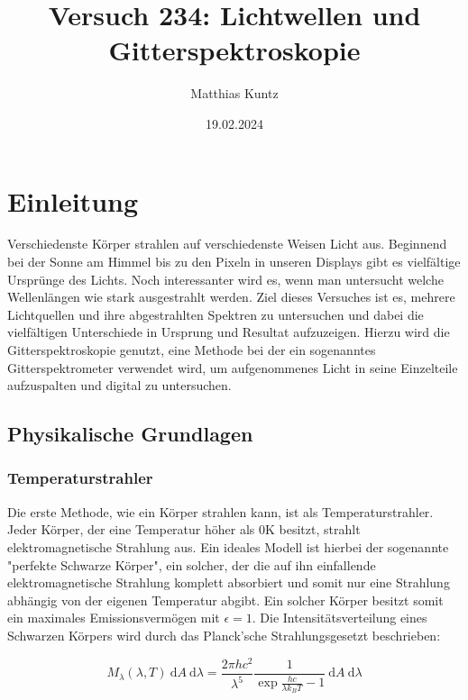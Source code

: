 \documentclass{article}
\title{Versuch 234: Lichtwellen und Gitterspektroskopie}
\author{Matthias Kuntz}
\date{19.02.2024}
\begin{document}
\maketitle

\tableofcontents

\newpage

\section{Einleitung}

Verschiedenste Körper strahlen auf verschiedenste Weisen Licht aus. Beginnend bei der Sonne am Himmel bis zu den Pixeln in unseren Displays gibt es vielfältige Ursprünge des Lichts. Noch interessanter wird es, wenn man untersucht welche Wellenlängen wie stark ausgestrahlt werden. Ziel dieses Versuches ist es, mehrere Lichtquellen und ihre abgestrahlten Spektren zu untersuchen und dabei die vielfältigen Unterschiede in Ursprung und Resultat aufzuzeigen. Hierzu wird die Gitterspektroskopie genutzt, eine Methode bei der ein sogenanntes Gitterspektrometer verwendet wird, um aufgenommenes Licht in seine Einzelteile aufzuspalten und digital zu untersuchen.  

\subsection{Physikalische Grundlagen}

\subsubsection{Temperaturstrahler}

Die erste Methode, wie ein Körper strahlen kann, ist als Temperaturstrahler. Jeder Körper, der eine Temperatur höher als 0K besitzt, strahlt elektromagnetische Strahlung aus. Ein ideales Modell ist hierbei der sogenannte "perfekte Schwarze Körper", ein solcher, der die auf ihn einfallende elektromagnetische Strahlung komplett absorbiert und somit nur eine Strahlung abhängig von der eigenen Temperatur abgibt. Ein solcher Körper besitzt somit ein maximales Emissionsvermögen mit $\epsilon = 1$. Die Intensitätsverteilung eines Schwarzen Körpers wird durch das Planck'sche Strahlungsgesetzt beschrieben:

\begin{equation}
    M_{\lambda}(\lambda, T) \ \text{d}A \ \text{d}\lambda = \frac{2 \pi h c^2}{\lambda^5} \frac{1}{\exp{\frac{hc}{\lambda k_B T}}-1} \ \text{d}A \ \text{d}\lambda
    \label{eq:planck}
\end{equation}
\end{document}
